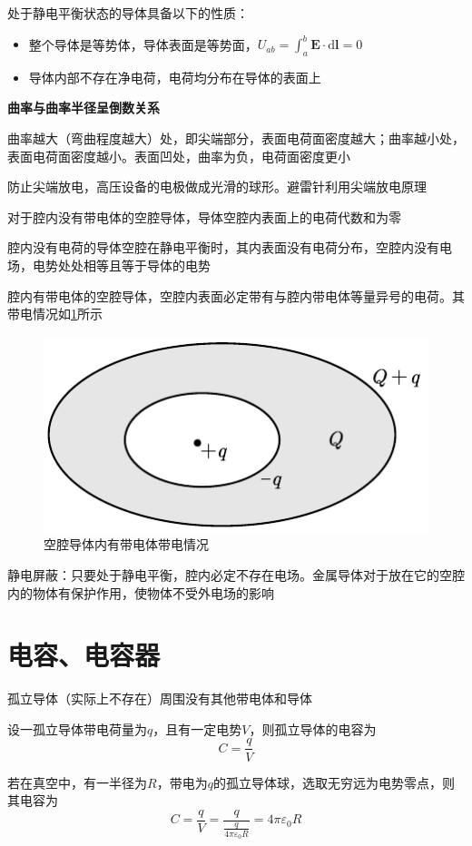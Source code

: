 \documentclass[12pt, a4paper, twoside]{ctexbook}
\begin{document}
处于静电平衡状态的导体具备以下的性质：
\begin{itemize}
    \item 整个导体是等势体，导体表面是等势面，$U_{ab}=\int_{a}^{b}\boldsymbol{E}\cdot\mathrm{d}\boldsymbol{l}=0$
    \item 导体内部不存在净电荷，电荷均分布在导体的表面上
\end{itemize}

\textbf{曲率与曲率半径呈倒数关系}

曲率越大（弯曲程度越大）处，即尖端部分，表面电荷面密度越大；曲率越小处，表面电荷面密度越小。表面凹处，曲率为负，电荷面密度更小

防止尖端放电，高压设备的电极做成光滑的球形。避雷针利用尖端放电原理

对于腔内没有带电体的空腔导体，导体空腔内表面上的电荷代数和为零

腔内没有电荷的导体空腔在静电平衡时，其内表面没有电荷分布，空腔内没有电场，电势处处相等且等于导体的电势

腔内有带电体的空腔导体，空腔内表面必定带有与腔内带电体等量异号的电荷。其带电情况如\textcolor{blue}{\cref{fig:空腔导体内有带电体带电情况}}所示
\begin{figure}[H]
    \centerline{\includegraphics[scale=1.0]{空腔导体内有带电体带电情况.pdf}}
    \caption{空腔导体内有带电体带电情况}\label{fig:空腔导体内有带电体带电情况}
\end{figure}
{\sonti 静电屏蔽}：只要处于静电平衡，腔内必定不存在电场。金属导体对于放在它的空腔内的物体有保护作用，使物体不受外电场的影响
\section{电容、电容器}
{\sonti 孤立导体（实际上不存在）}周围没有其他带电体和导体

设一孤立导体带电荷量为$q$，且有一定电势$V$，则孤立导体的电容为
$$
C=\frac{q}{V}
$$

若在真空中，有一半径为$R$，带电为$q$的孤立导体球，选取无穷远为电势零点，则其电容为
$$
C=\frac{q}{V}=\frac{q}{\frac{q}{4\pi\varepsilon_0R}}=4\pi\varepsilon_0R
$$
\end{document}

